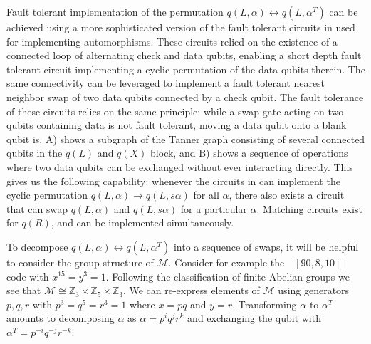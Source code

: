 \documentclass{article}
\begin{document}
Fault tolerant implementation of the permutation $q(L,\alpha) \leftrightarrow q(L,\alpha^T)$ can be achieved using a more sophisticated version of the fault tolerant circuits in  used for implementing automorphisms. These circuits relied on the existence of a connected loop of alternating check and data qubits, enabling a short depth fault tolerant circuit implementing a cyclic permutation of the data qubits therein. The same connectivity can be leveraged to implement a fault tolerant nearest neighbor swap of two data qubits connected by a check qubit. The fault tolerance of these circuits relies on the same principle: while a swap gate acting on two qubits containing data is not fault tolerant, moving a data qubit onto a blank qubit is.  A) shows a subgraph of the Tanner graph consisting of several connected qubits in the $q(L)$ and $q(X)$ block, and  B) shows a sequence of operations where two data qubits can be exchanged without ever interacting directly. This gives us the following capability: whenever the circuits in  can implement the cyclic permutation $q(L,\alpha)\to q(L,s\alpha )$ for all $\alpha$, there also exists a circuit that can swap $q(L,\alpha)$ and $q(L,s\alpha)$ for a particular $\alpha$. Matching circuits exist for $q(R)$, and can be implemented simultaneously.

To decompose $q(L,\alpha) \leftrightarrow q(L,\alpha^T)$ into a sequence of swaps, it will be helpful to consider the group structure of $\mathcal{M}$. Consider for example the $[[90,8,10]]$ code with $x^{15}= y^3 = 1$. 
Following the classification of finite Abelian groups we see that $\mathcal{M} \cong \mathbb{Z}_3 \times \mathbb{Z}_5 \times \mathbb{Z}_3$. We can re-express elements of $\mathcal{M}$ using generators $p,q,r$ with $p^3 = q^5 = r^3 =1$ where $x = pq$ and $y = r$. Transforming $\alpha$ to $\alpha^T$ amounts to decomposing $\alpha$ as $\alpha = p^i q^j r^k$ and exchanging the qubit with $\alpha^T = p^{-i} q^{-j} r^{-k}$.
\end{document}
